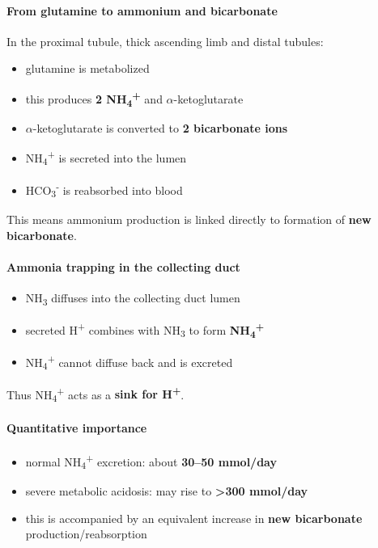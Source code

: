 \documentclass[11pt,a4paper]{article}
\begin{document}
\paragraph{From glutamine to ammonium and bicarbonate}
In the proximal tubule, thick ascending limb and distal tubules:
\begin{itemize}
  \item glutamine is metabolized
  \item this produces \textbf{2 NH\textsubscript{4}\textsuperscript{+}} and $\alpha$-ketoglutarate
  \item $\alpha$-ketoglutarate is converted to \textbf{2 bicarbonate ions}
  \item NH\textsubscript{4}\textsuperscript{+} is secreted into the lumen
  \item HCO\textsubscript{3}\textsuperscript{-} is reabsorbed into blood
\end{itemize}

This means ammonium production is linked directly to formation of \textbf{new bicarbonate}.

\paragraph{Ammonia trapping in the collecting duct}
\begin{itemize}
  \item NH\textsubscript{3} diffuses into the collecting duct lumen
  \item secreted H\textsuperscript{+} combines with NH\textsubscript{3} to form \textbf{NH\textsubscript{4}\textsuperscript{+}}
  \item NH\textsubscript{4}\textsuperscript{+} cannot diffuse back and is excreted
\end{itemize}

Thus NH\textsubscript{4}\textsuperscript{+} acts as a \textbf{sink for H\textsuperscript{+}}.

\paragraph{Quantitative importance}
\begin{itemize}
  \item normal NH\textsubscript{4}\textsuperscript{+} excretion: about \textbf{30--50 mmol/day}
  \item severe metabolic acidosis: may rise to \textbf{>300 mmol/day}
  \item this is accompanied by an equivalent increase in \textbf{new bicarbonate} production/reabsorption
\end{itemize}
\end{document}
